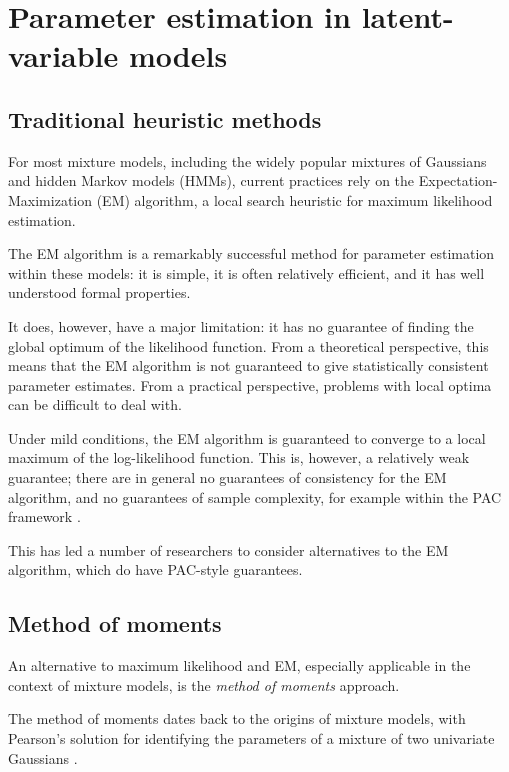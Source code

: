 \section{Parameter estimation in latent-variable models}

\subsection{Traditional heuristic methods}

For most mixture models, including the widely popular mixtures of Gaussians and hidden
Markov models (HMMs), current practices rely on the Expectation-Maximization (EM) algorithm,
a local search heuristic for maximum likelihood estimation.

The EM algorithm is a remarkably successful
method for parameter estimation within these models: it is simple, it is often relatively
efficient, and it has well understood formal properties.\cite{ref19} 

It does, however, have a major limitation: it has no guarantee of finding the global optimum of the likelihood function.
From a theoretical perspective, this means that the EM algorithm is not guaranteed to give
statistically consistent parameter estimates. From a practical perspective, problems with
local optima can be difficult to deal with.

Under mild conditions,
the EM algorithm is guaranteed to converge to a local maximum of the log-likelihood
function. This is, however, a relatively weak guarantee; there are in general no guarantees
of consistency for the EM algorithm, and no guarantees of sample complexity, for example
within the PAC framework \cite{ref19}. 

This has led a number of researchers to consider
alternatives to the EM algorithm, which do have PAC-style guarantees.






\subsection{Method of moments}

An alternative to maximum likelihood and EM, especially applicable in the context of mixture models,
is the \textit{method of moments} approach.

The method of moments dates back to the origins of mixture
models, with Pearson’s solution for identifying the parameters of a mixture of two univariate
Gaussians \cite{ref5}. 

